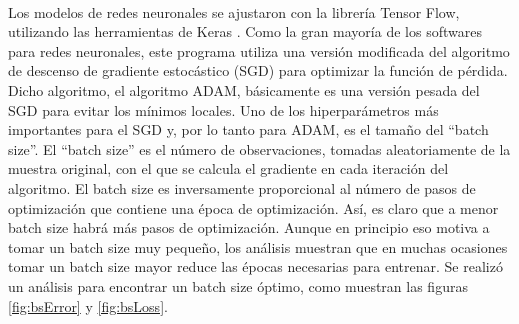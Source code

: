 \documentclass[11pt]{article}
\begin{document}
\\Los modelos de redes neuronales se ajustaron con la librería Tensor Flow, utilizando las herramientas de Keras \cite{tf}. Como la gran mayoría de los softwares para redes neuronales, este programa utiliza una versión modificada del algoritmo de descenso de gradiente estocástico (SGD) para optimizar la función de pérdida. Dicho algoritmo, el algoritmo ADAM, básicamente es una versión pesada del SGD para evitar los mínimos locales.  Uno de los hiperparámetros más importantes para el SGD y, por lo tanto para ADAM, es el tamaño del ``batch size''. El ``batch size'' es el número de observaciones, tomadas aleatoriamente de la muestra original, con el que se calcula el gradiente en cada iteración del algoritmo. El batch size es inversamente proporcional al número de pasos de optimización que contiene una época de optimización. Así, es claro que a menor batch size habrá más pasos de optimización. Aunque en principio eso motiva a tomar un batch size muy pequeño, los análisis muestran que en muchas ocasiones tomar un batch size mayor reduce las épocas necesarias para entrenar. Se realizó un análisis para encontrar un batch size óptimo, como muestran las figuras \ref{fig:bsError} y \ref{fig:bsLoss}.
\end{document}
